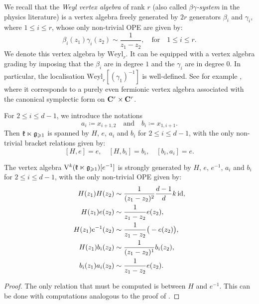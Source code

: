 We recall that the \emph{Weyl vertex algebra} of rank $r$ (also called \emph{$\beta\gamma$-system} in the physics literature) is a vertex algebra freely generated by $2 r$ generators $\beta_i$ and $\gamma_i$, where $1 \leqslant i \leqslant r$, whose only non-trivial OPE are given by:
\[ \beta_i(z_1) \gamma_i(z_2) \sim \frac{1}{z_1 - z_2}, \quad \text{for} \quad 1 \leqslant i \leqslant r. \]
We denote this vertex algebra by $\mathrm{Weyl}_r$. It can be equipped with a vertex algebra grading by imposing that the $\beta_i$ are in degree $1$ and the $\gamma_i$ are in degree $0$. In particular, the localisation $\mathrm{Weyl}_r[(\gamma_1)^{-1}]$ is well-defined. See for example \cite[Section 1.8]{desole2006finite}, where it corresponds to a purely even fermionic vertex algebra associated with the canonical symplectic form on $\mathbf{C}^r \times \mathbf{C}^r$. 

For $2 \leqslant i \leqslant d - 1$, we introduce the notations
\[ a_i \coloneqq x_{i + 1, 2} \quad \text{and} \quad b_i \coloneqq x_{1, i + 1}. \]
Then $\mathfrak k \ltimes \mathfrak g_{\geqslant 1}$ is spanned by $H$, $e$, $a_i$ and $b_i$ for $2 \leqslant i \leqslant d - 1$, with the only non-trivial bracket relations given by:
\[ [H, e] = e, \quad [H, b_i] = b_i, \quad [b_i, a_i] =e. \]

\begin{proposition} \label{proposition:relations-dual-w-algebra}
	The vertex algebra $\mathrm V^k(\mathfrak k \ltimes \mathfrak g_{\geqslant 1})[e^{-1}]$ is strongly generated by $H$, $e$, $e^{-1}$, $a_i$ and $b_i$ for $2 \leqslant i \leqslant d - 1$, with the only non-trivial OPE given by:
	\[ \begin{aligned}
		H(z_1) H(z_2) & \sim \frac{1}{(z_1 - z_2)^2} \frac{d-1}{d} k \operatorname{id}, \\
		H(z_1) e(z_2) & \sim \frac{1}{z_1 - z_2} e(z_2), \\
		H(z_1) e^{-1}(z_2) & \sim \frac{1}{z_1 - z_2} \big(- e(z_2)\big), \\
		H(z_1) b_i(z_2) & \sim \frac{1}{(z_1 - z_2)^1} b_i(z_2), \\
		b_i(z_1) a_i(z_2) & \sim \frac{1}{z_1 - z_2} e(z_2).
	\end{aligned}\]
\end{proposition}

\begin{proof}
	The only relation that must be computed is between $H$ and $e^{-1}$. This can be done with computations analogous to the proof of .
\end{proof}


